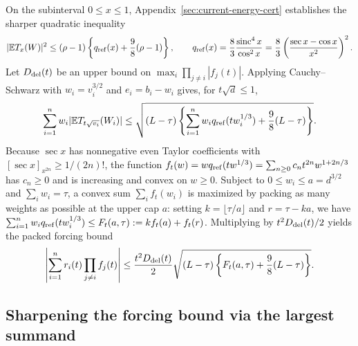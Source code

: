 \documentclass[11pt]{article}
\numberwithin{equation}{section}
\theoremstyle{remark}
\DeclareMathOperator{\sinc}{sinc}
\newcommand{\E}{\mathbb E}
\begin{document}
On the subinterval $0\le x\le1$, Appendix~\ref{sec:current-energy-cert}
establishes the sharper quadratic inequality
\begin{equation}\label{eq:current-energy}
 |\E T_x(W)|^2\le(\rho-1)
     \left\{q_{\rm ref}(x)+\frac98(\rho-1)\right\},\qquad
 q_{\rm ref}(x)=\frac83\frac{\sinc^4x}{\cos^2x}=\frac83\left(\frac{\sec x-\cos x}{x^2}\right)^2.
\end{equation}
Let $D_{\rm del}(t)$ be an upper bound on $\max_i\prod_{j\ne i}|f_j(t)|$.
Applying Cauchy--Schwarz with $w_i=v_i^{3/2}$ and $e_i=b_i-w_i$ gives, for
$t\sqrt d\le1$,
\[
 \sum_{i=1}^n w_i|\E T_{t\sqrt{v_i}}(W_i)|
 \le\sqrt{(L-\tau)\left\{\sum_{i=1}^n w_iq_{\rm ref}(tw_i^{1/3})+\frac98(L-\tau)\right\}}.
\]
Because $\sec x$ has nonnegative even Taylor coefficients with
$[\sec x]_{x^{2n}}\ge1/(2n)!$, the function
$f_t(w)=wq_{\rm ref}(tw^{1/3})=\sum_{n\ge0}c_nt^{2n}w^{1+2n/3}$ has
$c_n\ge0$ and is increasing and convex on $w\ge0$. Subject to
$0\le w_i\le a=d^{3/2}$ and $\sum_i w_i=\tau$, a convex sum $\sum_i f_t(w_i)$
is maximized by packing as many weights as possible at the upper cap $a$:
setting $k=\lfloor\tau/a\rfloor$ and $r=\tau-ka$, we have
$\sum_{i=1}^n w_iq_{\rm ref}(tw_i^{1/3})\le F_t(a,\tau):=kf_t(a)+f_t(r)$.
Multiplying by $t^2D_{\rm del}(t)/2$ yields the packed forcing bound
\begin{equation}\label{eq:current-packed-source}
 \left|\sum_{i=1}^n r_i(t)\prod_{j\ne i}f_j(t)\right|
 \le\frac{t^2D_{\rm del}(t)}2
 \sqrt{(L-\tau)\left\{F_t(a,\tau)+\frac98(L-\tau)\right\}}.
\end{equation}

\subsection{Sharpening the forcing bound via the largest summand}
\label{sec:split-reference}
\end{document}
